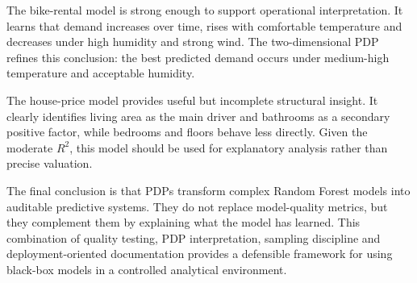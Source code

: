 \documentclass[
]{article}
\begin{document}
The bike-rental model is strong enough to support operational interpretation. It learns that demand increases over time, rises with comfortable temperature and decreases under high humidity and strong wind. The two-dimensional PDP refines this conclusion: the best predicted demand occurs under medium-high temperature and acceptable humidity.

The house-price model provides useful but incomplete structural insight. It clearly identifies living area as the main driver and bathrooms as a secondary positive factor, while bedrooms and floors behave less directly. Given the moderate $R^2$, this model should be used for explanatory analysis rather than precise valuation.

The final conclusion is that PDPs transform complex Random Forest models into auditable predictive systems. They do not replace model-quality metrics, but they complement them by explaining what the model has learned. This combination of quality testing, PDP interpretation, sampling discipline and deployment-oriented documentation provides a defensible framework for using black-box models in a controlled analytical environment.
\end{document}
